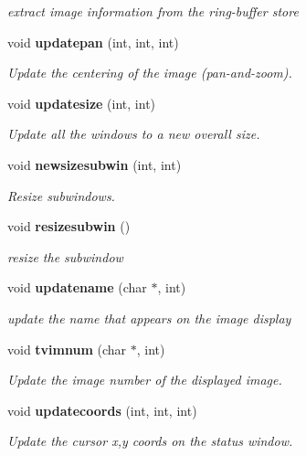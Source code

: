 \begin{CompactItemize}
\begin{CompactList}\small\item\em extract image information from the ring-buffer store \item\end{CompactList}\item 
void {\bf updatepan} (int, int, int)
\begin{CompactList}\small\item\em Update the centering of the image (pan-and-zoom). \item\end{CompactList}\item 
void {\bf updatesize} (int, int)
\begin{CompactList}\small\item\em Update all the windows to a new overall size. \item\end{CompactList}\item 
void {\bf newsizesubwin} (int, int)
\begin{CompactList}\small\item\em Resize subwindows. \item\end{CompactList}\item 
void {\bf resizesubwin} ()
\begin{CompactList}\small\item\em resize the subwindow \item\end{CompactList}\item 
void {\bf updatename} (char $\ast$, int)
\begin{CompactList}\small\item\em update the name that appears on the image display \item\end{CompactList}\item 
void {\bf tvimnum} (char $\ast$, int)
\begin{CompactList}\small\item\em Update the image number of the displayed image. \item\end{CompactList}\item 
void {\bf updatecoords} (int, int, int)
\begin{CompactList}\small\item\em Update the cursor x,y coords on the status window. \item\end{CompactList}\item 

\end{CompactItemize}
